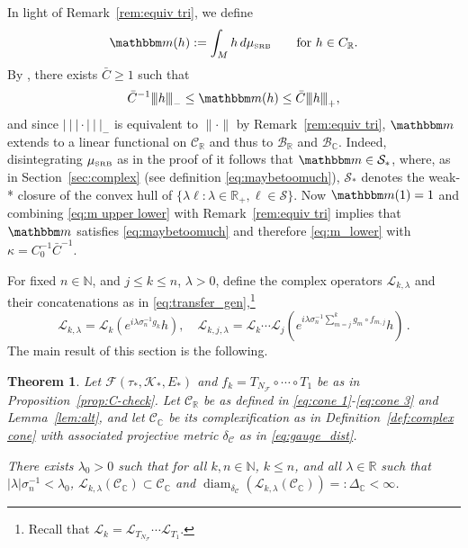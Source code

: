 \documentclass{amsart}
\numberwithin{equation}{section}
\newtheorem{thm}{Theorem}[section]
\newcommand\cB{{\mathcal B}}
\newcommand\cC{{\mathcal C}}
\newcommand\cF{{\mathcal F}}
\newcommand\cK{{\mathcal K}}
\newcommand\cL{{\mathcal L}}
\newcommand\cS{{\mathcal S}}
\newcommand\bC{{\mathbb C}}
\newcommand\bR{{\mathbb R}}
\newcommand{\bbm}{\mathbbm m}
\newcommand{\tri}{{|\:\!\!|\:\!\!|}}
\newcommand{\musrb}{\mu_{\mbox{\tiny SRB}}}
\newcommand{\diam}{\operatorname{diam}}
\begin{document}
In light of Remark~\ref{rem:equiv tri}, we define 
\begin{equation}
\bbm(h) := \int_M h \, d\musrb \qquad \mbox{for $h \in C_{\bR}$.}
\end{equation}
By \cite[Remark~7.2]{DL22}, there exists $\bar{C} \ge 1$ such that
\begin{equation}
\label{eq:m upper lower}
\bar{C}^{-1}\tri h \tri_- \le \bbm(h) \le \bar{C} \tri h \tri_+ ,
\end{equation}
and since $\tri \cdot \tri_-$ is equivalent
to $\| \cdot \|$ by Remark~\ref{rem:equiv tri}, $\bbm$ extends to a linear functional on $\cC_{\bR}$ and thus to $\cB_{\bR}$ and $\cB_{\bC}$.  Indeed, disintegrating $\musrb$ as in the proof of
\cite[Lemma~7.1]{DL22} it follows that $\bbm \in \cS_*$, where, as in Section~\ref{sec:complex}
(see definition \eqref{eq:maybetoomuch}), $\cS_*$ denotes the weak-* closure of the convex hull of 
$\{ \lambda \ell : \lambda \in \bR_+, \ell \in \cS \}$.
Now $\bbm(1) = 1$ and combining \eqref{eq:m upper lower} with Remark~\ref{rem:equiv tri}
implies that $\bbm$ satisfies  
\eqref{eq:maybetoomuch} and therefore \eqref{eq:m_lower} with $\kappa = C_0^{-1} \bar{C}^{-1}$.


For fixed $n \in \mathbb{N}$, and $j \le k \le n$, $\lambda >0$, define the complex operators 
$\cL_{k,\lambda}$ and their concatenations
 as in \eqref{eq:transfer_gen},\footnote{ Recall that $\cL_k = \cL_{T_{N_\cF}} \cdots \cL_{T_1}$.}
\[
\cL_{k ,\lambda} = \cL_k (e^{i \lambda \sigma_n^{-1} g_k} h), \quad
\cL_{k,j,\lambda} = \cL_k \cdots \cL_j( e^{i \lambda \sigma_n^{-1} \sum_{m=j}^k g_m \circ f_{m,j}} h) \, .
\]
The main result of this section is the following.

\begin{thm}
\label{thm:complex contract}
Let $\cF(\tau_*, \cK_*, E_*)$ and $f_k = T_{N_\cF} \circ \cdots \circ T_1$ be as in Proposition~\ref{prop:C-check}.
Let $\cC_{\bR}$ be as defined in \eqref{eq:cone 1}-\eqref{eq:cone 3} and Lemma~\ref{lem:alt},
and let $\cC_{\bC}$ be its complexification as in Definition~\ref{def:complex cone} with
associated projective metric $\delta_{\cC}$ as in \eqref{eq:gauge_dist}.

There exists $\lambda_0 > 0$ such that for all $k , n \in \mathbb{N}$, $k \le n$, and 
all $\lambda \in \mathbb{R}$ such that $|\lambda| \sigma_n^{-1} < \lambda_0$, 
$\cL_{k, \lambda}( \cC_{\bC} ) \subset \cC_{\bC}$ and $\diam_{\delta_{\cC}}(\cL_{k,\lambda}(\cC_{\bC})) =: \Delta_{\bC}  < \infty$.
\end{thm}
\end{document}
